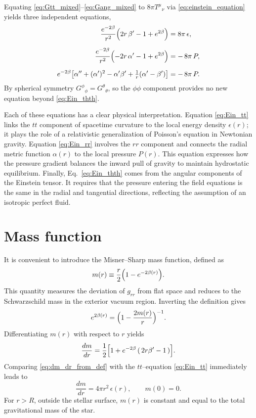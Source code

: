 Equating \eqref{eq:Gtt_mixed}--\eqref{eq:Gang_mixed} to $8\pi T^{\mu}{}_{\nu}$ 
via \eqref{eq:einstein_equation} yields three independent equations,
\begin{align}
\frac{e^{-2\beta}}{r^{2}}\Bigl(2r\,\beta'-1+e^{2\beta}\Bigr) &= 8\pi\,\epsilon, 
\label{eq:Ein_tt}\\[6pt]
\frac{e^{-2\beta}}{r^{2}}\Bigl(-2r\,\alpha'-1+e^{2\beta}\Bigr) &= -\,8\pi\,P,
\label{eq:Ein_rr}\\[6pt]
e^{-2\beta}\!\left[\alpha''+(\alpha')^{2}-\alpha'\beta'
   +\tfrac{1}{r}(\alpha'-\beta')\right] &= -\,8\pi\,P.
\label{eq:Ein_thth}
\end{align}
By spherical symmetry $G^{\phi}{}_{\phi}=G^{\theta}{}_{\theta}$, 
so the $\phi\phi$ component provides no new equation beyond \eqref{eq:Ein_thth}.  

Each of these equations has a clear physical interpretation.  
Equation \eqref{eq:Ein_tt} links the $tt$ component of spacetime curvature 
to the local energy density $\epsilon(r)$; it plays the role of a relativistic 
generalization of Poisson’s equation in Newtonian gravity.  
Equation \eqref{eq:Ein_rr} involves the $rr$ component and connects the radial 
metric function $\alpha(r)$ to the local pressure $P(r)$. 
This equation expresses how the pressure gradient balances the inward pull of gravity 
to maintain hydrostatic equilibrium.  
Finally, Eq.~\eqref{eq:Ein_thth} comes from the angular components of the Einstein tensor. 
It requires that the pressure entering the field equations is the same in the radial 
and tangential directions, reflecting the assumption of an isotropic perfect fluid.  


\section{Mass function}

It is convenient to introduce the Misner--Sharp mass function, defined as
\begin{equation}
m(r)\equiv \frac{r}{2}\Bigl(1-e^{-2\beta(r)}\Bigr).
\label{eq:ms_mass}
\end{equation}
This quantity measures the deviation of $g_{rr}$ from flat space and reduces to the 
Schwarzschild mass in the exterior vacuum region. Inverting the definition gives
\begin{equation}
e^{2\beta(r)}=\Bigl(1-\frac{2m(r)}{r}\Bigr)^{-1}.
\label{eq:ms_mass_inv}
\end{equation}
Differentiating $m(r)$ with respect to $r$ yields
\begin{equation}
\frac{dm}{dr}=\frac{1}{2}\Bigl[1+e^{-2\beta}\,(\,2r\beta'-1\,)\Bigr].
\label{eq:dm_dr_from_def}
\end{equation}
Comparing \eqref{eq:dm_dr_from_def} with the $tt$--equation \eqref{eq:Ein_tt} immediately leads to
\begin{equation}
\frac{dm}{dr}=4\pi r^{2}\,\epsilon(r), \qquad m(0)=0.
\label{eq:mass_equation}
\end{equation}
For $r>R$, outside the stellar surface, $m(r)$ is constant and equal to the total gravitational 
mass of the star.  

